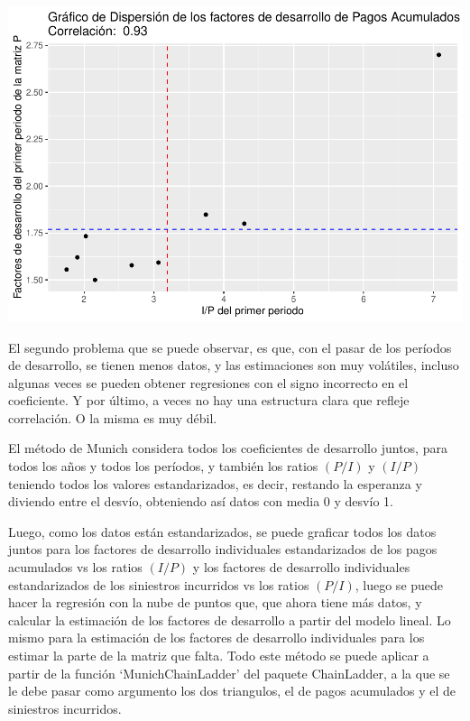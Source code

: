 \documentclass[
  12pt,
]{article}
\begin{document}
\includegraphics{informe_files/figure-latex/unnamed-chunk-27-1.pdf}

El segundo problema que se puede observar, es que, con el pasar de los
períodos de desarrollo, se tienen menos datos, y las estimaciones son
muy volátiles, incluso algunas veces se pueden obtener regresiones con
el signo incorrecto en el coeficiente. Y por último, a veces no hay una
estructura clara que refleje correlación. O la misma es muy débil.

El método de Munich considera todos los coeficientes de desarrollo
juntos, para todos los años y todos los períodos, y también los ratios
\((P/I)\) y \((I/P)\) teniendo todos los valores estandarizados, es
decir, restando la esperanza y diviendo entre el desvío, obteniendo así
datos con media 0 y desvío 1.

Luego, como los datos están estandarizados, se puede graficar todos los
datos juntos para los factores de desarrollo individuales estandarizados
de los pagos acumulados vs los ratios \((I/P)\) y los factores de
desarrollo individuales estandarizados de los siniestros incurridos vs
los ratios \((P/I)\), luego se puede hacer la regresión con la nube de
puntos que, que ahora tiene más datos, y calcular la estimación de los
factores de desarrollo a partir del modelo lineal. Lo mismo para la
estimación de los factores de desarrollo individuales para los estimar
la parte de la matriz que falta. Todo este método se puede aplicar a
partir de la función `MunichChainLadder' del paquete ChainLadder, a la
que se le debe pasar como argumento los dos triangulos, el de pagos
acumulados y el de siniestros incurridos.
\end{document}

